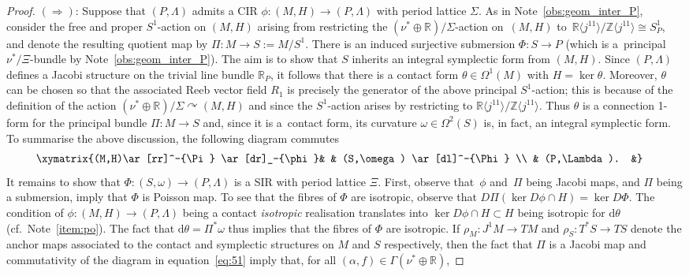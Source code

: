 \documentclass[pdftex]{sigma}
\numberwithin{equation}{section}
\newcommand{\de}{\mathrm{d}} %
\newcommand{\CM}{(M,H)} %
\newcommand{\SM}{(S,\omega)} %
\newcommand{\PM}{(P,\Lambda)} %
\newcommand{\RR}{\mathbb{R}}
\newcommand{\ZZ}{\mathbb{Z}}
\begin{document}
\begin{proof}
\underline{$(\Rightarrow)$}: Suppose that $\PM$ admits a CIR $\phi \colon \CM \to \PM$ with period lattice $\Sigma$. As in Note~\ref{obs:geom_inter_P}, consider the free and proper $S^1$-action on $\CM$ arising from restricting the $(\nu^*\oplus \RR)/\Sigma$-action on~$\CM$ to~$\RR \langle j^11\rangle /\ZZ \langle j^11\rangle \cong S^1_P$, and denote the resulting quotient map by $\Pi \colon M \to S := M/S^1$. There is an induced surjective submersion $\Phi \colon S \to P$ (which is a~principal $\nu^*/\Xi$-bundle by Note~\ref{obs:geom_inter_P}). The aim is to show that $S$ inherits an integral symplectic form from $\CM$. Since $\PM$ def\/ines a Jacobi structure on the trivial line bundle $\RR_P$, it follows that there is a contact form $\theta \in \Omega^1(M)$ with $H = \ker \theta$. Moreover, $\theta$ can be chosen so that the associated Reeb vector f\/ield $R_1$ is precisely the generator of the above principal $S^1$-action; this is because of the def\/inition of the action $(\nu^*\oplus \RR)/\Sigma \curvearrowright \CM$ and since the $S^1$-action arises by restricting to $\RR \langle j^11\rangle /\ZZ \langle j^11\rangle$. Thus $\theta$ is a connection 1-form for the principal bundle $\Pi\colon M \to S$ and, since it is a~contact form, its curvature $\omega \in \Omega^2(S)$ is, in fact, an integral symplectic form. To summarise the above discussion, the following diagram commutes
 \begin{gather} \label{eq:51}\begin{split} &
 \xymatrix{\CM \ar[rr]^-{\Pi} \ar[dr]_-{\phi}& & \SM
 \ar[dl]^-{\Phi} \\
 & \PM. &}\end{split}
 \end{gather}
It remains to show that $\Phi \colon \SM \to \PM$ is a SIR with period lattice $\Xi$. First, observe that~$\phi$ and~$\Pi$ being Jacobi maps, and $\Pi$ being a submersion, imply that $\Phi$ is Poisson map. To see that the f\/ibres of $\Phi$ are isotropic, observe that $D\Pi( \ker D\phi \cap H) = \ker D \Phi$. The condition of $\phi \colon \CM \to \PM$ being a contact {\it isotropic} realisation translates into $\ker D\phi \cap H \subset H$ being isotropic for $\de \theta$ (cf.\ Note~\ref{item:po}). The fact that $\de \theta = \Pi^* \omega$ thus implies that the f\/ibres of $\Phi$ are isotropic. If $\rho_M \colon J^1M \to TM$ and $\rho_S \colon T^*S \to TS$ denote the anchor maps associated to the contact and symplectic structures on $M$ and $S$ respectively, then the fact that $\Pi$ is a Jacobi map and commutativity of the diagram in equation~\eqref{eq:51} imply that, for all $(\alpha,f) \in \Gamma(\nu^* \oplus \RR)$,

\end{proof}
\end{document}

